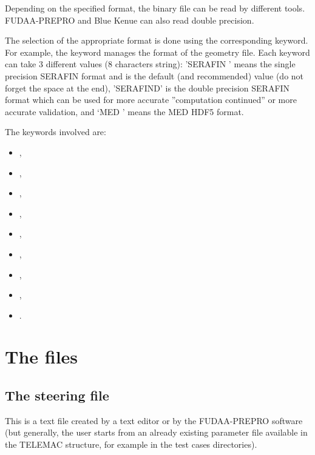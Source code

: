 Depending on the specified format, the binary file can be read by different
tools.
FUDAA-PREPRO and Blue Kenue can also read double precision.

The selection of the appropriate format is done using the corresponding keyword.
For example, the keyword  manages the format
of the geometry file.
Each keyword can take 3 different values (8 characters string): 'SERAFIN ' means
the single precision SERAFIN format and is the default (and recommended)
value (do not forget the space at the end),
'SERAFIND' is the double precision SERAFIN format which can be used
for more accurate ''computation continued'' or more accurate validation,
and `MED     ' means the MED HDF5 format.

The keywords involved are:

\begin{itemize}
\item {},

\item {},

\item {},

\item {},

\item {},

\item {},

\item {},

\item {},

\item {}.
\end{itemize}


\section{The files}


\subsection{The steering file}

This is a text file created by a text editor or by the FUDAA-PREPRO software
(but generally, the user starts from an already existing parameter file available
in the TELEMAC structure, for example in the test cases directories).

